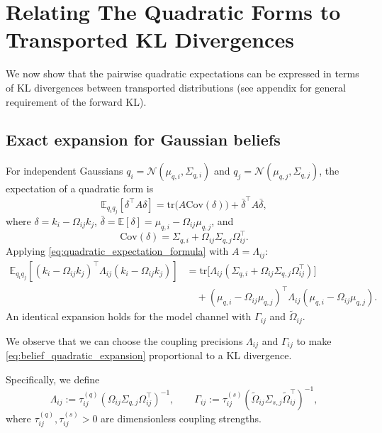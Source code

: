 \documentclass[11pt]{article}
\begin{document}
\section{Relating The Quadratic Forms to Transported KL Divergences}
We now show that the pairwise quadratic expectations can be expressed in terms of KL divergences between transported distributions (see appendix for general requirement of the forward KL).
\subsection{Exact expansion for Gaussian beliefs}
For independent Gaussians $q_i = \mathcal{N}(\mu_{q,i},\Sigma_{q,i})$ and $q_j = \mathcal{N}(\mu_{q,j},\Sigma_{q,j})$, the expectation of a quadratic form is
\begin{equation}
\mathbb{E}_{q_i q_j}[\delta^\top A \delta]
= \mathrm{tr}\big(A\mathrm{Cov}(\delta)\big)
+ \bar{\delta}^\top A \bar{\delta},
\label{eq:quadratic_expectation_formula}
\end{equation}
where $\delta = k_i - \Omega_{ij}k_j$, $\bar{\delta} = \mathbb{E}[\delta] = \mu_{q,i} - \Omega_{ij}\mu_{q,j}$, and
\begin{equation}
\mathrm{Cov}(\delta) = \Sigma_{q,i} + \Omega_{ij}\Sigma_{q,j}\Omega_{ij}^\top.
\end{equation}
Applying \eqref{eq:quadratic_expectation_formula} with $A = \Lambda_{ij}$:
\begin{equation}
\begin{aligned}
\mathbb{E}_{q_i q_j}
[(k_i-\Omega_{ij}k_j)^\top\Lambda_{ij}(k_i-\Omega_{ij}k_j)]
&=\mathrm{tr}\big[\Lambda_{ij}(\Sigma_{q,i}+\Omega_{ij}\Sigma_{q,j}\Omega_{ij}^\top)\big]\\
&\quad+(\mu_{q,i}-\Omega_{ij}\mu_{q,j})^\top
\Lambda_{ij}
(\mu_{q,i}-\Omega_{ij}\mu_{q,j}).
\end{aligned}
\label{eq:belief_quadratic_expansion}
\end{equation}
An identical expansion holds for the model channel with $\Gamma_{ij}$ and $\tilde{\Omega}_{ij}$.

We observe that we can choose the coupling precisions $\Lambda_{ij}$ and $\Gamma_{ij}$ to make \eqref{eq:belief_quadratic_expansion} proportional to a KL divergence.

Specifically, we define
\begin{equation}
\Lambda_{ij}:=\tau^{(q)}_{ij}(\Omega_{ij}\Sigma_{q,j}\Omega_{ij}^\top)^{-1},
\qquad
\Gamma_{ij}:=\tau^{(s)}_{ij}(\tilde{\Omega}_{ij}\Sigma_{s,j}\tilde{\Omega}_{ij}^\top)^{-1},
\end{equation}
where $\tau^{(q)}_{ij}, \tau^{(s)}_{ij} > 0$ are dimensionless coupling strengths.
\end{document}
